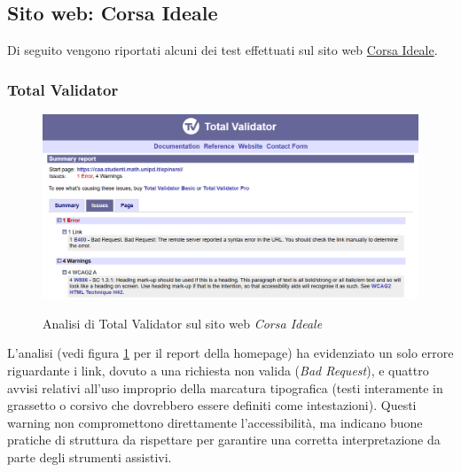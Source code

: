 \newpage
\subsection{Sito web: Corsa Ideale}
\noindent Di seguito vengono riportati alcuni dei test effettuati sul sito web \href{https://caa.studenti.math.unipd.it/epinarel/}{Corsa Ideale}.
\subsubsection{Total Validator}
\begin{figure}[H]
    \centering
    \includegraphics[width=0.8\linewidth, alt={Screenshot dell'analisi di Total Validator sul sito web Corsa Ideale}]{img/TV_corsaideale.png}
    \caption{Analisi di Total Validator sul sito web \textit{Corsa Ideale}}\label{fig:TV_corsaideale}
\end{figure}

\noindent \noindent L’analisi (vedi figura \ref{fig:TV_corsaideale} per il report della homepage) ha evidenziato un solo errore riguardante i link, dovuto a una richiesta non valida (\textit{Bad Request}), e quattro avvisi relativi all’uso improprio della marcatura tipografica (testi interamente in grassetto o corsivo che dovrebbero essere definiti come intestazioni). Questi warning non compromettono direttamente l’accessibilità, ma indicano buone pratiche di struttura da rispettare per garantire una corretta interpretazione da parte degli strumenti assistivi.

